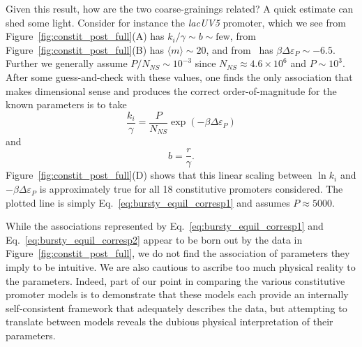 Given this result, how are the two coarse-grainings related? A quick estimate
can shed some light. Consider for instance the \textit{lacUV5} promoter, which
we see from Figure~\ref{fig:constit_post_full}(A) has $k_i/\gamma \sim b \sim
\text{few}$, from Figure~\ref{fig:constit_post_full}(B) has $\langle m \rangle
\sim 20$, and from~\cite{Brewster2012} has $\beta\Delta\varepsilon_P \sim -
6.5$. Further we generally assume $P/N_{NS} \sim 10^{-3}$ since
$N_{NS}\approx4.6\times10^6$ and $P\sim10^3$. After some guess-and-check with
these values, one finds the only association that makes dimensional sense and
produces the correct order-of-magnitude for the known parameters is to take
\begin{equation}
\frac{k_i}{\gamma} = \frac{P}{N_{NS}} \exp(-\beta\Delta\varepsilon_P)
\label{eq:bursty_equil_corresp1}
\end{equation}
and
\begin{equation}
b = \frac{r}{\gamma}.
\label{eq:bursty_equil_corresp2}
\end{equation}
Figure~\ref{fig:constit_post_full}(D) shows that this linear scaling between
$\ln k_i$ and $-\beta\Delta\varepsilon_P$ is approximately true for all 18
constitutive promoters considered. The plotted line is simply
Eq.~\ref{eq:bursty_equil_corresp1} and assumes $P\approx 5000$.

While the associations represented by Eq.~\ref{eq:bursty_equil_corresp1} and
Eq.~\ref{eq:bursty_equil_corresp2} appear to be born out by the data in
Figure~\ref{fig:constit_post_full}, we do not find the association of parameters
they imply to be intuitive. We are also cautious to ascribe too much physical
reality to the parameters. Indeed, part of our point in comparing the various
constitutive promoter models is to demonstrate that these models each provide an
internally self-consistent framework that adequately describes the data, but
attempting to translate between models reveals the dubious physical
interpretation of their parameters.

